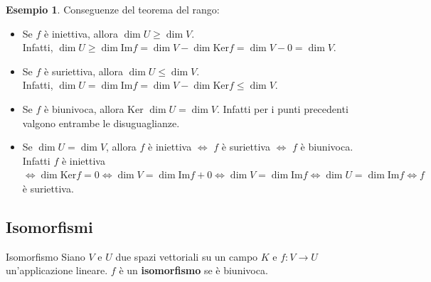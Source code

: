 \documentclass[a4paper]{article}
\theoremstyle{definition}
\newtheorem*{es}{Esempio}
\begin{document}
\begin{es}
	Conseguenze del teorema del rango:
	\begin{itemize}
		\item Se $f$ è iniettiva, allora $\dim U \geq \dim V$. \\
		      Infatti, $\dim U \geq \dim \text{Im} f = \dim V - \dim \text{Ker} f = \dim V - 0 = \dim V$.
		\item Se $f$ è suriettiva, allora $\dim U \leq \dim V$. \\
		      Infatti, $\dim U = \dim \text{Im} f = \dim V - \dim \text{Ker} f \leq \dim V$.
		\item Se $f$ è biunivoca, allora Ker $\dim U = \dim V$. Infatti per i punti precedenti valgono entrambe le disuguaglianze.
		\item Se $\dim U = \dim V$, allora $f$ è iniettiva $\Leftrightarrow$ $f$ è suriettiva $\Leftrightarrow$ $f$ è biunivoca. \\
		      Infatti $f$ è iniettiva $\Leftrightarrow \dim \text{Ker} f = 0 \Leftrightarrow \dim V = \dim \text{Im} f + 0 \Leftrightarrow \dim V = \dim \text{Im} f \Leftrightarrow \dim U = \dim \text{Im} f \Leftrightarrow f$ è suriettiva.
	\end{itemize}
\end{es}

\subsection{Isomorfismi}
\begin{deff}{Isomorfismo}{}
	Siano $V$ e $U$ due spazi vettoriali su un campo $K$ e $f: V \rightarrow U$ un'applicazione lineare.
	$f$ è un \textbf{isomorfismo} se è biunivoca.
\end{deff}
\end{document}
